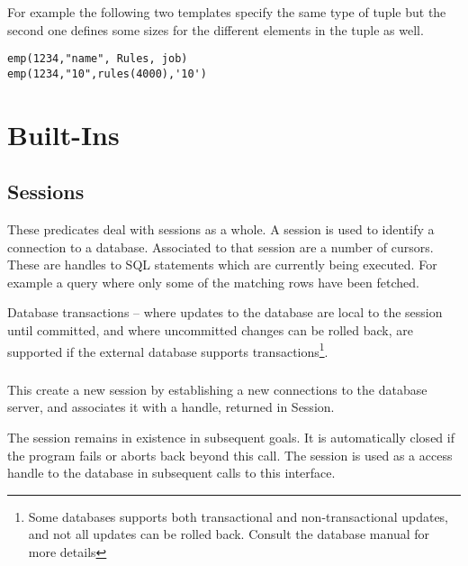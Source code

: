 For example the following two templates specify the same type of tuple
but the second one defines some sizes for the different elements in the
tuple as well.
\begin{verbatim}
emp(1234,"name", Rules, job)
emp(1234,"10",rules(4000),'10')
\end{verbatim}

\section{Built-Ins}

\subsection{Sessions}

These predicates deal with sessions as a whole. A session is 
used to identify a connection to a database. Associated to that
session are a number of cursors. These are handles to SQL statements
which are currently being executed. For example a query where only
some of the matching rows have been fetched.


Database transactions -- where updates to the database are local to the
session until committed, and where uncommitted changes can be rolled back, 
are supported if the external database supports transactions\footnote{Some
databases supports both transactional and non-transactional updates,
and not all updates can be rolled back. Consult the database manual for
more details}. 

\subsubsection{}
\label{session-start/3}

This create a new session by establishing a new connections to the
database server, and associates it with a handle,
returned in Session.

The session remains in existence in subsequent goals. It is automatically
closed if the program fails or aborts back beyond this call. The session
is used as a access handle to the database in subsequent calls to this
interface.

